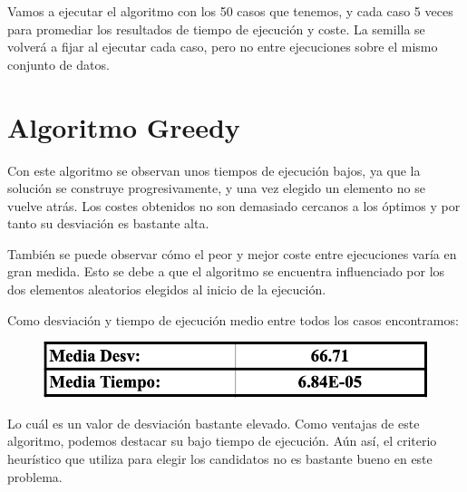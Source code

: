 Vamos a ejecutar el algoritmo con los 50 casos que tenemos, y cada caso 5 veces para promediar los resultados de tiempo de ejecución y coste. La semilla se volverá a fijar al ejecutar cada caso, pero no entre ejecuciones sobre el mismo conjunto de datos.

\section{Algoritmo Greedy}
Con este algoritmo se observan unos tiempos de ejecución bajos, ya que la solución se construye progresivamente, y una vez elegido un elemento no se vuelve atrás. Los costes obtenidos no son demasiado cercanos a los óptimos y por tanto su desviación es bastante alta. 

También se puede observar cómo el peor y mejor coste entre ejecuciones varía en gran medida. Esto se debe a que el algoritmo se encuentra influenciado por los dos elementos aleatorios elegidos al inicio de la ejecución.

Como desviación y tiempo de ejecución medio entre todos los casos encontramos:
\begin{figure}[H] %
    \centering
        \includegraphics[scale=0.35]{img/greedy2.png}
\end{figure}

Lo cuál es un valor de desviación bastante elevado. Como ventajas de este algoritmo, podemos destacar su bajo tiempo de ejecución. Aún así, el criterio heurístico que utiliza para elegir los candidatos no es bastante bueno en este problema.

